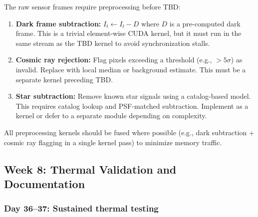 \documentclass[11pt,letterpaper]{article}
\begin{document}
The raw sensor frames require preprocessing before TBD:
\begin{enumerate}[leftmargin=2em]
    \item \textbf{Dark frame subtraction:} $I_t \gets I_t - D$ where $D$
    is a pre-computed dark frame. This is a trivial element-wise CUDA
    kernel, but it must run in the same stream as the TBD kernel to avoid
    synchronization stalls.
    \item \textbf{Cosmic ray rejection:} Flag pixels exceeding a threshold
    (e.g., $> 5\sigma$) as invalid. Replace with local median or
    background estimate. This must be a separate kernel preceding TBD.
    \item \textbf{Star subtraction:} Remove known star signals using a
    catalog-based model. This requires catalog lookup and PSF-matched
    subtraction. Implement as a kernel or defer to a separate module
    depending on complexity.
\end{enumerate}

\noindent All preprocessing kernels should be fused where possible (e.g.,
dark subtraction + cosmic ray flagging in a single kernel pass) to
minimize memory traffic.

\subsection{Week 8: Thermal Validation and Documentation}

\subsubsection{Day 36--37: Sustained thermal testing}
\end{document}
